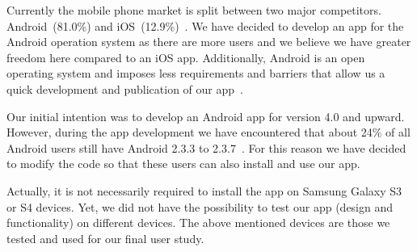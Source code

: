 \begin{description}[leftmargin=0cm]
	\item[Android] Currently the mobile phone market is split between two major competitors. Android~(81.0\%) and iOS~(12.9\%)~\cite{androidiosmarketshare}. 
	We have decided to develop an app for the Android operation system as there are more users and we believe we have greater freedom here compared to an iOS app. 
 	Additionally, Android is an open operating system and imposes less requirements and barriers that allow us a quick development and publication of our app~\cite{publishios, publishandroid}. 
	\item[Version] Our initial intention was to develop an Android app for version 4.0 and upward.
 However, during the app development we have encountered that about 24\% of all Android users still have Android 2.3.3 to 2.3.7~\cite{versionsandroid}. For this reason we have decided to modify the code so that these users can also install and use our app.
	\item[Samsung Galaxy S3 or S4] Actually, it is not necessarily required to install the app on Samsung Galaxy S3 or S4 devices. 
Yet, we did not have the possibility to test our app (design and functionality) on different devices.
The above mentioned devices are those we tested and used for our final user study.
\end{description}

